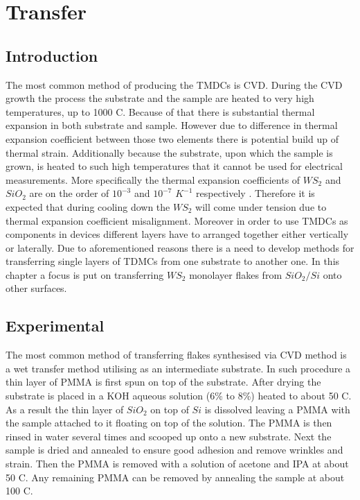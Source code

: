 \chapter{Transfer}
\label{cha:Transfer}
\section{Introduction}
		The most common method of producing the TMDCs is CVD. During the CVD growth the process the substrate and the sample are heated to very high temperatures, up to 1000 {\degree}C. Because of that there is substantial thermal expansion in both substrate and sample. However due to difference in thermal expansion coefficient between those two elements there is potential build up of thermal strain. Additionally because the substrate, upon which the sample is grown, is heated to such high temperatures that it cannot be used for electrical measurements. More specifically the thermal expansion coefficients of $WS_2$ and $SiO_2$ are on the order of $10^{-3}$ and $10^{-7}$ $K^{-1}$ respectively \cite{Hu2018}\cite{Tada2000}. Therefore it is expected that during cooling down the $WS_2$ will come under tension due to thermal expansion coefficient misalignment. Moreover in order to use TMDCs as components in devices different layers have to arranged together either vertically or laterally. Due to aforementioned reasons there is a need to develop methods for transferring single layers of TDMCs from one substrate to another one. In this chapter a focus is put on transferring $WS_2$ monolayer flakes from $SiO_2/Si$ onto other surfaces.
		
\section{Experimental}
		
	The most common method of transferring flakes synthesised via CVD method is a wet transfer method utilising as an intermediate substrate. In such procedure a thin layer of PMMA is first spun on top of the substrate. After drying the substrate is placed in a KOH aqueous solution (6\% to 8\%) heated to about 50 {\degree}C. As a result the thin layer of $SiO_2$ on top of $Si$ is dissolved leaving a PMMA with the sample attached to it floating on top of the solution. The PMMA is then rinsed in water several times and scooped up onto a new substrate. Next the sample is dried and annealed to ensure good adhesion and remove wrinkles and strain. Then the PMMA is removed with a solution of acetone and IPA at about 50 {\degree}C. Any remaining PMMA can be removed by annealing the sample at about 100 {\degree}C.  
		
